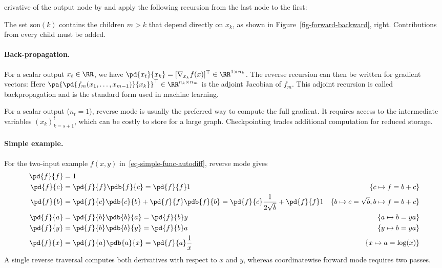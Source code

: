 erivative of the output node by
and apply the following recursion from the last node to the first:
 
The set $\text{son}(k)$ contains the children $m>k$ that depend directly on $x_k$, as shown in Figure~\ref{fig-forward-backward}, right. Contributions from every child must be added.

   
\paragraph{Back-propagation.}

For a scalar output $x_t \in \RR$, we have $\pd{x_t}{x_k} = [\nabla_{x_k} f(x)]^\top \in \RR^{1 \times n_k}$. The reverse recursion can then be written for gradient vectors:
Here $\pa{\pd{f_m(x_1,\ldots,x_{m-1})}{x_k}}^\top \in \RR^{n_k \times n_m}$ is the adjoint Jacobian of $f_m$. This adjoint recursion is called backpropagation and is the standard form used in machine learning.

For a scalar output ($n_t=1$), reverse mode is usually the preferred way to compute the full gradient. It requires access to the intermediate variables $(x_k)_{k=s+1}^t$, which can be costly to store for a large graph. Checkpointing trades additional computation for reduced storage.

   
\paragraph{Simple example.}

For the two-input example $f(x,y)$ in~\eqref{eq-simple-func-autodiff}, reverse mode gives
\begin{align*}
		\pd{f}{f} &= 1 &\\
		\pd{f}{c} &= \pd{f}{f} \pdb{f}{c} = \pd{f}{f} 1 &
			\{ c \mapsto f = b+c\}\\
		\pd{f}{b} &= \pd{f}{c} \pdb{c}{b} + \pd{f}{f} \pdb{f}{b} = \pd{f}{c} \frac{1}{2\sqrt{b}} + \pd{f}{f} 1 & 
			\{ b \mapsto c=\sqrt{b}, b \mapsto f=b+c\} \\
		\pd{f}{a} &= \pd{f}{b} \pdb{b}{a} = \pd{f}{b} y & 
			\{ a \mapsto b=y a\} \\
		\pd{f}{y} &= \pd{f}{b} \pdb{b}{y} = \pd{f}{b} a & 
			\{ y \mapsto b=ya\} \\
		\pd{f}{x} &= \pd{f}{a} \pdb{a}{x} = \pd{f}{a} \frac{1}{x} & 
			\{ x \mapsto a=\log(x)\}
\end{align*}
A single reverse traversal computes both derivatives with respect to $x$ and $y$, whereas coordinatewise forward mode requires two passes.

